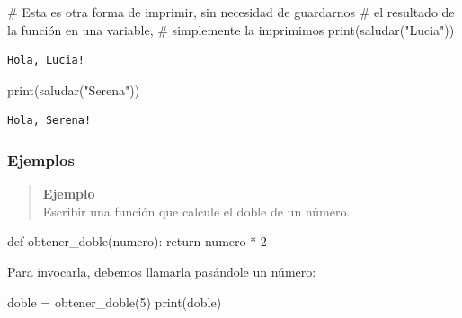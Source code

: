 \documentclass[
  letterpaper,
  DIV=11,
  numbers=noendperiod]{scrreprt}
\newenvironment{Shaded}{\begin{snugshade}}{\end{snugshade}}
\newcommand{\BuiltInTok}[1]{\textcolor[rgb]{0.00,0.23,0.31}{#1}}
\newcommand{\CommentTok}[1]{\textcolor[rgb]{0.37,0.37,0.37}{#1}}
\newcommand{\ControlFlowTok}[1]{\textcolor[rgb]{0.00,0.23,0.31}{#1}}
\newcommand{\DecValTok}[1]{\textcolor[rgb]{0.68,0.00,0.00}{#1}}
\newcommand{\KeywordTok}[1]{\textcolor[rgb]{0.00,0.23,0.31}{#1}}
\newcommand{\NormalTok}[1]{\textcolor[rgb]{0.00,0.23,0.31}{#1}}
\newcommand{\OperatorTok}[1]{\textcolor[rgb]{0.37,0.37,0.37}{#1}}
\newcommand{\StringTok}[1]{\textcolor[rgb]{0.13,0.47,0.30}{#1}}
\begin{document}
\begin{Shaded}
\begin{Highlighting}[]
\CommentTok{\# Esta es otra forma de imprimir, sin necesidad de guardarnos}
\CommentTok{\# el resultado de la función en una variable,}
\CommentTok{\# simplemente la imprimimos}
\BuiltInTok{print}\NormalTok{(saludar(}\StringTok{"Lucia"}\NormalTok{))}
\end{Highlighting}
\end{Shaded}

\begin{verbatim}
Hola, Lucia!
\end{verbatim}

\begin{Shaded}
\begin{Highlighting}[]
\BuiltInTok{print}\NormalTok{(saludar(}\StringTok{"Serena"}\NormalTok{))}
\end{Highlighting}
\end{Shaded}

\begin{verbatim}
Hola, Serena!
\end{verbatim}

\hypertarget{ejemplos}{%
\subsubsection{Ejemplos}\label{ejemplos}}

\begin{quote}
\textbf{Ejemplo}\\
Escribir una función que calcule el doble de un número.
\end{quote}

\begin{Shaded}
\begin{Highlighting}[]
\KeywordTok{def}\NormalTok{ obtener\_doble(numero):}
  \ControlFlowTok{return}\NormalTok{ numero }\OperatorTok{*} \DecValTok{2}
\end{Highlighting}
\end{Shaded}

Para invocarla, debemos llamarla pasándole un número:

\begin{Shaded}
\begin{Highlighting}[]
\NormalTok{doble }\OperatorTok{=}\NormalTok{ obtener\_doble(}\DecValTok{5}\NormalTok{)}
\BuiltInTok{print}\NormalTok{(doble)}
\end{Highlighting}
\end{Shaded}
\end{document}

